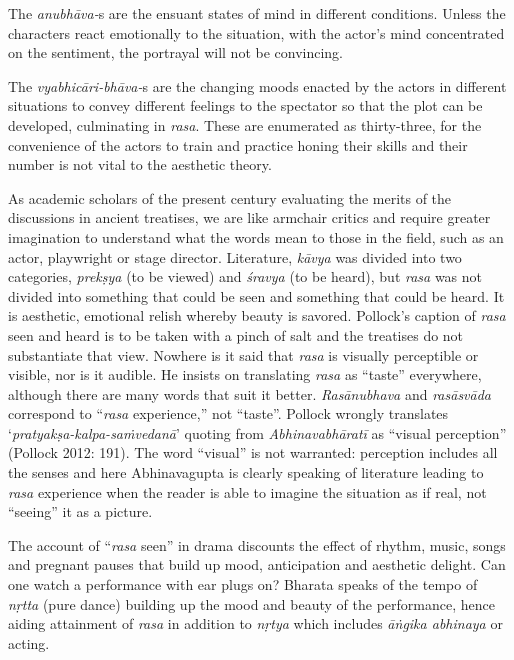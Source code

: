 The \textit{anubhāva-}s are the ensuant states of mind in different conditions. Unless the characters react emotionally to the situation, with the actor’s mind concentrated on the sentiment, the portrayal will not be convincing.

The \textit{vyabhicāri-bhāva-}s are the changing moods enacted by the actors in different situations to convey different feelings to the spectator so that the plot can be developed, culminating in \textit{rasa}. These are enumerated as thirty-three, for the convenience of the actors to train and practice honing their skills and their number is not vital to the aesthetic theory.

As academic scholars of the present century evaluating the merits of the discussions in ancient treatises, we are like armchair critics and require greater imagination to understand what the words mean to those in the field, such as an actor, playwright or stage director. Literature, \textit{kāvya }was divided into two categories, \textit{prekṣya} (to be viewed) and \textit{śravya }(to be heard), but \textit{rasa} was not divided into something that could be seen and something that could be heard. It is aesthetic, emotional relish whereby beauty is savored. Pollock’s caption of \textit{rasa} seen and heard is to be taken with a pinch of salt and the treatises do not substantiate that view. Nowhere is it said that \textit{rasa} is visually perceptible or visible, nor is it audible. He insists on translating \textit{rasa} as “taste” everywhere, although there are many words that suit it better. \textit{Rasānubhava} and \textit{rasāsvāda} correspond to “\textit{rasa} experience,” not “taste”. Pollock wrongly translates ‘\textit{pratyakṣa-kalpa-saṁvedanā}’ quoting from \textit{Abhinavabhāratī} as “visual perception” (Pollock 2012: 191). The word “visual” is not warranted: perception includes all the senses and here Abhinavagupta is clearly speaking of literature leading to \textit{rasa} experience when the reader is able to imagine the situation as if real, not “seeing” it as a picture.

The account of “\textit{rasa} seen” in drama discounts the effect of rhythm, music, songs and pregnant pauses that build up mood, anticipation and aesthetic delight. Can one watch a performance with ear plugs on? Bharata speaks of the tempo of \textit{nṛtta} (pure dance) building up the mood and beauty of the performance, hence aiding attainment of \textit{rasa} in addition to \textit{nṛtya} which includes \textit{āṅgika abhinaya} or acting.

